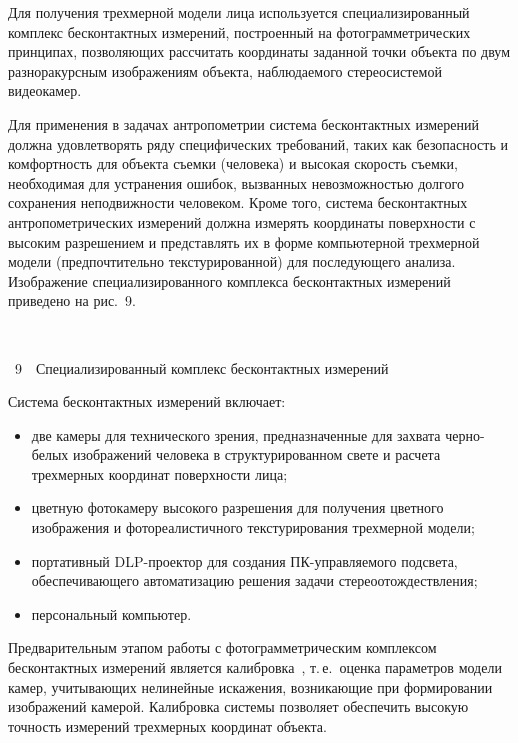 \begin{multicols}{2}
\bigskip
\addtocounter{figure}{1}


Для получения трехмерной модели лица используется специализированный комплекс бесконтактных измерений, построенный на 
фотограмметрических принципах, позволяющих рассчитать \mbox{координаты} заданной точки объекта по двум разноракурсным 
изображениям объекта, наблюдаемого стереосистемой видеокамер.

Для применения в задачах антропометрии сис\-те\-ма бесконтактных измерений должна удовлетворять ряду специфических 
требований, таких как безопасность и комфортность для объекта съемки (человека) и высокая скорость съемки, необходимая для 
устранения ошибок, вызванных невозможностью долгого сохранения неподвижности человеком. Кроме того, система 
бесконтактных антропометрических измерений должна измерять координаты поверхности с высоким разрешением и 
представлять их в форме компьютерной трехмерной модели (предпочтительно текстурированной) для последующего анализа. 
Изображение специализированного комплекса бесконтактных измерений приведено на рис.~9.



\begin{center} %
\vspace*{6pt}
\mbox{%
\epsfxsize=80mm
}
\end{center}
\vspace*{2pt}
{{\figurename~9}\ \ \small{Специализированный комплекс  бесконтактных измерений}}


\bigskip
\addtocounter{figure}{1}


Система бесконтактных измерений включает:
\begin{itemize}
\item две камеры для технического зрения, предназначенные для захвата черно-белых изображений человека в 
структурированном свете и расчета трехмерных координат поверхности лица;
\item цветную фотокамеру высокого разрешения для получения цветного изображения и фотореалистичного текстурирования 
трехмерной модели;
\item портативный DLP-проектор для создания ПК-управляемого подсвета, обеспечивающего автоматизацию решения задачи 
стереоотождествления;
\item персональный компьютер.
\end{itemize}

Предварительным этапом работы с фо\-то\-грам\-мет\-ри\-ческим комплексом бесконтактных измерений является 
калибровка~\cite{4kor, 5kor}, т.\,е.\ оценка па\-ра\-мет\-ров модели камер, учитывающих нелинейные\linebreak
 искажения, возникающие при 
формировании изоб\-ра\-же\-ний камерой. Калибровка системы поз\-во\-ля\-ет обеспечить высокую точность измерений трехмерных 
координат объекта.


\end{multicols}
